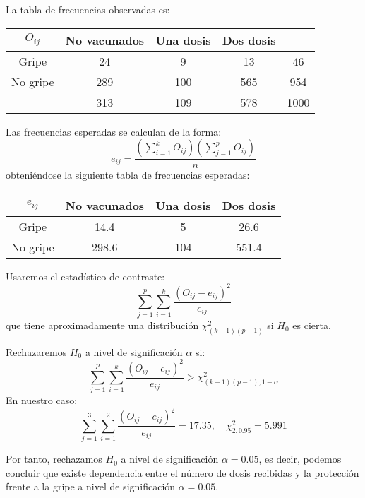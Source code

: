 \begin{example}
    La tabla de frecuencias observadas es:
    \begin{center}
        \begin{tabular}{| c | c c c | c |}
            \hline
            $O_{ij}$ & No vacunados & Una dosis & Dos dosis &      \\
            \hline
            Gripe    & 24           & 9         & 13        & 46   \\
            No gripe & 289          & 100       & 565       & 954  \\
            \hline
                     & 313          & 109       & 578       & 1000 \\
            \hline
        \end{tabular}
    \end{center}

    Las frecuencias esperadas se calculan de la forma:
    $$e_{ij} = \frac{(\sum_{i=1}^k O_{ij})(\sum_{j=1}^p O_{ij})}{n}$$
    obteniéndose la siguiente tabla de frecuencias esperadas:
    \begin{center}
        \begin{tabular}{| c | c c c |}
            \hline
            $e_{ij}$ & No vacunados & Una dosis & Dos dosis \\
            \hline
            Gripe    & 14.4         & 5         & 26.6      \\
            No gripe & 298.6        & 104       & 551.4     \\
            \hline
        \end{tabular}
    \end{center}

    Usaremos el estadístico de contraste:
    $$\sum_{j=1}^p \sum_{i=1}^k \frac{(O_{ij}-e_{ij})^2}{e_{ij}}$$
    que tiene aproximadamente una distribución $\chi^2_{(k-1)(p-1)}$ si $H_0$ es cierta.

    Rechazaremos $H_0$ a nivel de significación $\alpha$ si:
    $$\sum_{j=1}^p \sum_{i=1}^k \frac{(O_{ij}-e_{ij})^2}{e_{ij}} > \chi^2_{(k-1)(p-1), 1-\alpha}$$
    En nuestro caso:
    $$\sum_{j=1}^3 \sum_{i=1}^2 \frac{(O_{ij}-e_{ij})^2}{e_{ij}} = 17.35, \quad \chi^2_{2, 0.95} = 5.991$$

    Por tanto, rechazamos $H_0$ a nivel de significación $\alpha = 0.05$, es decir, podemos concluir que existe dependencia entre el número de dosis recibidas y la protección frente a la gripe a nivel de significación $\alpha = 0.05$.
\end{example}


